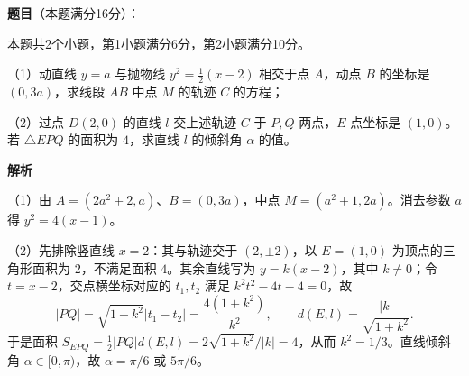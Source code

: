\begin{answer}

\textbf{题目}（本题满分16分）：

本题共2个小题，第1小题满分6分，第2小题满分10分。

（1）动直线 $y=a$ 与抛物线 $y^2=\frac12(x-2)$ 相交于点 $A$，动点 $B$ 的坐标是 $(0,3a)$，求线段 $AB$ 中点 $M$ 的轨迹 $C$ 的方程；

（2）过点 $D(2,0)$ 的直线 $l$ 交上述轨迹 $C$ 于 $P,Q$ 两点，$E$ 点坐标是 $(1,0)$。若 $\triangle EPQ$ 的面积为 $4$，求直线 $l$ 的倾斜角 $\alpha$ 的值。

\textbf{解析}

（1）由 $A=(2a^2+2,a)$、$B=(0,3a)$，中点 $M=(a^2+1,2a)$。消去参数 $a$ 得 $y^2=4(x-1)$。

（2）先排除竖直线 $x=2$：其与轨迹交于 $(2,\pm2)$，以 $E=(1,0)$ 为顶点的三角形面积为 $2$，不满足面积 $4$。其余直线写为 $y=k(x-2)$，其中 $k\ne0$；令 $t=x-2$，交点横坐标对应的 $t_1,t_2$ 满足 $k^2t^2-4t-4=0$，故
\nopagebreak[4]
\[
|PQ|=\sqrt{1+k^2}|t_1-t_2|=\frac{4(1+k^2)}{k^2},\qquad
d(E,l)=\frac{|k|}{\sqrt{1+k^2}}.
\]
于是面积 $S_{EPQ}=\frac12|PQ|d(E,l)=2\sqrt{1+k^2}/|k|=4$，从而 $k^2=1/3$。直线倾斜角 $\alpha\in[0,\pi)$，故 $\alpha=\pi/6$ 或 $5\pi/6$。


\end{answer}
